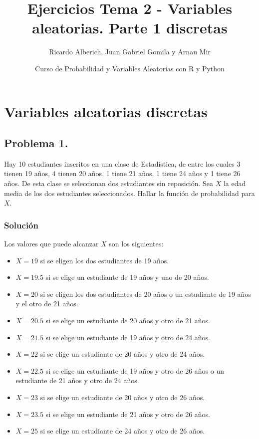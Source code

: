 \documentclass[
]{article}
\title{Ejercicios Tema 2 - Variables aleatorias. Parte 1 discretas}
\author{Ricardo Alberich, Juan Gabriel Gomila y Arnau Mir}
\date{Curso de Probabilidad y Variables Aleatorias con R y Python}
\providecommand{\tightlist}{%
  \setlength{\itemsep}{0pt}\setlength{\parskip}{0pt}}
\begin{document}
\maketitle

{
\hypersetup{linkcolor=blue}
\setcounter{tocdepth}{4}
\tableofcontents
}
\hypertarget{variables-aleatorias-discretas}{%
\section{Variables aleatorias
discretas}\label{variables-aleatorias-discretas}}

\hypertarget{problema-1.}{%
\subsection{Problema 1.}\label{problema-1.}}

Hay 10 estudiantes inscritos en una clase de Estadística, de entre los
cuales 3 tienen 19 años, 4 tienen 20 años, 1 tiene 21 años, 1 tiene 24
años y 1 tiene 26 años. De esta clase se seleccionan dos estudiantes sin
reposición. Sea \(X\) la edad media de los dos estudiantes
seleccionados. Hallar la función de probabilidad para \(X\).

\hypertarget{soluciuxf3n}{%
\subsubsection{Solución}\label{soluciuxf3n}}

Los valores que puede alcanzar \(X\) son los siguientes:

\begin{itemize}
\tightlist
\item
  \(X=19\) si se eligen los dos estudiantes de 19 años.
\item
  \(X=19.5\) si se elige un estudiante de 19 años y uno de 20 años.
\item
  \(X=20\) si se eligen los dos estudiantes de 20 años o un estudiante
  de 19 años y el otro de 21 años.
\item
  \(X=20.5\) si se elige un estudiante de 20 años y otro de 21 años.
\item
  \(X=21.5\) si se elige un estudiante de 19 años y otro de 24 años.
\item
  \(X=22\) si se elige un estudiante de 20 años y otro de 24 años.
\item
  \(X=22.5\) si se elige un estudiante de 19 años y otro de 26 años o un
  estudiante de 21 años y otro de 24 años.
\item
  \(X=23\) si se elige un estudiante de 20 años y otro de 26 años.
\item
  \(X=23.5\) si se elige un estudiante de 21 años y otro de 26 años.
\item
  \(X=25\) si se elige un estudiante de 24 años y otro de 26 años.
\end{itemize}
\end{document}
